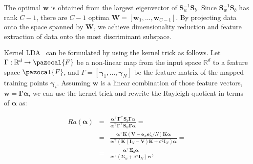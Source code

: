 
The optimal $\mathbf{w}$ is obtained from the largest eigenvector
of $\mathbf{S}_{w}^{-1}\mathbf{S}_{b}$. Since $\mathbf{S}_{w}^{-1}\mathbf{S}_{b}$ has rank $C - 1$, there are $C - 1$ optima $\mathbf{W} = [ \mathbf{w}_{1}, \ldots, \mathbf{w}_{C-1} ]$.
By projecting data onto the space spanned by $\mathbf{W}$, we
achieve dimensionality reduction and feature extraction
of data onto the most discriminant subspace.

Kernel LDA~\cite{scholkopft1999fisher,baudat2000generalized,li2001constructing} can be formulated by using the kernel trick as follows. Let $\Gamma: \mathbb{R}^ {d} \rightarrow \pazocal{F}$ be a non-linear map from the input space $\mathbb{R}^ {d}$ to a feature space $\pazocal{F}$,
and $\Gamma = [\mathbf{\gamma}_{1},\ldots,\mathbf{\gamma}_{N}]$ be the feature matrix of the mapped training points $\mathbf{\gamma}_{i}$. Assuming $\mathbf{w}$ is a linear combination of those feature vectors, $\mathbf{w} = \mathbf{\Gamma}\mathbf{\alpha}$, we can use the kernel trick and rewrite the Rayleigh quotient in terms of $\mathbf{\alpha}$ as:

\begin{eqnarray}
    Ra(\mathbf{\alpha}) &=& \frac{\mathbf{\alpha}^{\top}\mathbf{\Gamma}^{\top}\mathbf{S}_{b}\mathbf{\Gamma} \mathbf{\alpha}}{\mathbf{\alpha}^{\top}\mathbf{\Gamma} ^{\top}\mathbf{S}_{w}\mathbf{\Gamma} \mathbf{\alpha}} = \nonumber\\
    &=& \frac{\mathbf{\alpha}^{\top}\mathbf{K}(\mathbf{V} - \mathbf{e}_{N}\mathbf{e}_{N}^{\top}/N)\mathbf{K}\mathbf{\alpha}}{\mathbf{\alpha}^{\top}(\mathbf{K}(\mathbf{I}_{N}-\mathbf{V})\mathbf{K}+ \sigma^{2}\mathbf{I}_{N})\mathbf{\alpha}} = \nonumber\\
    &=& \frac{\mathbf{\alpha}^{\top}\mathbf{\Sigma}_{b}\mathbf{\alpha}}{\mathbf{\alpha}^{\top}(\mathbf{\Sigma}_{w}+\sigma^{2}\mathbf{I}_{N})\mathbf{\alpha}},
\end{eqnarray}


